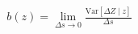 \documentclass[preview]{standalone}
\begin{document}
\begin{align*}
b(z)=\lim_{\Delta s\to0}\frac{\mathrm{Var}[\Delta Z\mid z]}{\Delta s}
\end{align*}
\end{document}
